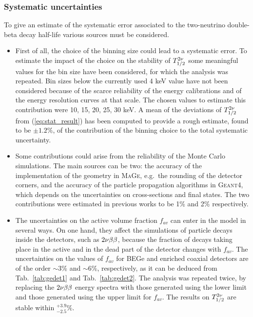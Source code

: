 \subsubsection*{Systematic uncertainties}
To give an estimate of the systematic error associated to the two-neutrino double-beta decay half-life various sources must be considered.
\begin{itemize}
	\item First of all, the choice of the binning size could lead to a systematic error. To estimate the impact of the choice on the stability of $T_{1/2}^{2\nu}$ some meaningful values for the bin size have been considered, for which the analysis was repeated. Bin sizes below the currently used 4 keV value have not been considered because of the scarce reliability of the energy calibrations and of the energy resolution curves at that scale. The chosen values to estimate this contribution were 10, 15, 20, 25, 30 keV. A mean of the deviations of $T_{1/2}^{2\nu}$ from (\ref{eq:stat_result}) has been computed to provide a rough estimate, found to be $\pm1.2\%$, of the contribution of the binning choice to the total systematic uncertainty.
	\item Some contributions could arise from the reliability of the Monte Carlo simulations. The main sources can be two: the accuracy of the implementation of the {\gerda} geometry in \textsc{MaGe}, e.g.~the rounding of the detector corners, and the accuracy of the particle propagation algorithms in \textsc{Geant4}, which depends on the uncertainties on cross-sections and final states. The two contributions were estimated in previous works to be 1\% \cite{gerda2nbb} and 2\% \cite{geant4sys1, geant4sys2, geant4sys3} respectively.
	\item The uncertainties on the active volume fraction $f_{av}$ can enter in the model in several ways. On one hand, they affect the simulations of particle decays inside the detectors, such as $2\nu\beta\beta$, because the fraction of decays taking place in the active and in the dead part of the detector changes with $f_{av}$. The uncertainties on the values of $f_{av}$ for BEGe and enriched coaxial detectors are of the order $\sim$3\% and $\sim$6\%, respectively, as it can be deduced from Tab.~\ref{tab:gedet1} and Tab.~\ref{tab:gedet2}. The analysis was repeated twice, by replacing the $2\nu\beta\beta$ energy spectra with those generated using the lower limit and those generated using the upper limit for $f_{av}$. The results on $T_{1/2}^{2\nu}$ are stable within $^{+3.9}_{-2.5}\%$.


\end{itemize}
